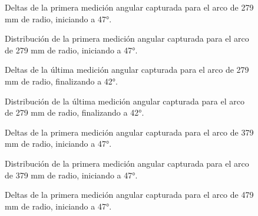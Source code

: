 \begin{figure}[H]
	\centering
	\caption{Deltas de la primera medición angular capturada para el arco de 279 mm de radio, iniciando a 47°.}
	\label{fig:lecturas_theta47_4}
\end{figure}

\begin{figure}[H]
	\centering
	\caption{Distribución de la primera medición angular capturada para el arco de 279 mm de radio, iniciando a 47°.}
	\label{fig:histograma_theta47_4}
\end{figure}

\begin{figure}[H]
	\centering
	\caption{Deltas de la última medición angular capturada para el arco de 279 mm de radio, finalizando a 42°.}
	\label{fig:lecturas_theta42_4}
\end{figure}

\begin{figure}[H]
	\centering
	\caption{Distribución de la última medición angular capturada para el arco de 279 mm de radio, finalizando a 42°.}
	\label{fig:histograma_theta42_4}
\end{figure}


\begin{figure}[H]
	\centering
	\caption{Deltas de la primera medición angular capturada para el arco de 379 mm de radio, iniciando a 47°.}
	\label{fig:lecturas_theta47_6}
\end{figure}

\begin{figure}[H]
	\centering
	\caption{Distribución de la primera medición angular capturada para el arco de 379 mm de radio, iniciando a 47°.}
	\label{fig:histograma_theta47_6}
\end{figure}


\begin{figure}[H]
	\centering
	\caption{Deltas de la primera medición angular capturada para el arco de 479 mm de radio, iniciando a 47°.}
	\label{fig:lecturas_theta47_8}
\end{figure}

